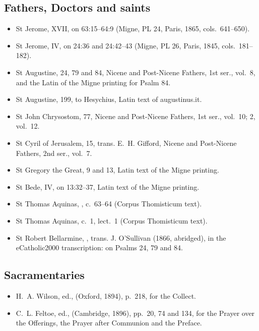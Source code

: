 {\subsection*{Fathers, Doctors and saints}
\begin{itemize}[itemsep=0pt,topsep=.25em]
\item St Jerome,  XVII, on 63:15--64:9 (Migne, PL 24, Paris, 1865, cols.~641--650).
\item St Jerome,  IV, on 24:36 and 24:42--43 (Migne, PL 26, Paris, 1845, cols.~181--182).
\item St Augustine,  24, 79 and 84, Nicene and Post-Nicene Fathers, 1st ser., vol.~8, and the Latin of the Migne printing for Psalm 84.
\item St Augustine,  199, to Hesychius, Latin text of augustinus.it.
\item St John Chrysostom,  77, Nicene and Post-Nicene Fathers, 1st ser., vol.~10;  2, vol.~12.
\item St Cyril of Jerusalem,  15, trans. E.~H. Gifford, Nicene and Post-Nicene Fathers, 2nd ser., vol.~7.
\item St Gregory the Great,  9 and 13, Latin text of the Migne printing.
\item St Bede,  IV, on 13:32--37, Latin text of the Migne printing.
\item St Thomas Aquinas, , c.~63--64 (Corpus Thomisticum text).
\item St Thomas Aquinas,  c.~1, lect.~1 (Corpus Thomisticum text).
\item St Robert Bellarmine, , trans. J. O'Sullivan (1866, abridged), in the eCatholic2000 transcription: on Psalms 24, 79 and 84.
\end{itemize}

\subsection*{Sacramentaries}
\begin{itemize}[itemsep=0pt,topsep=.25em]
\item H.~A. Wilson, ed.,  (Oxford, 1894), p.~218, for the Collect.
\item C.~L. Feltoe, ed.,  (Cambridge, 1896), pp.~20, 74 and 134, for the Prayer over the Offerings, the Prayer after Communion and the Preface.
\end{itemize}

}
